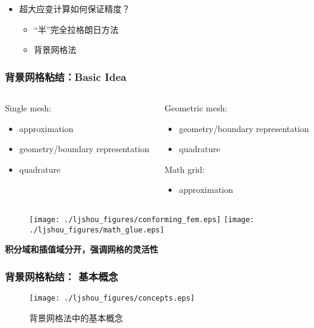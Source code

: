 \documentclass[mathserif]{beamer}
\begin{document}
\begin{CJK}{UTF8}{gkai}
\begin{frame}
\begin{itemize}
				\item 超大应变计算如何保证精度？

				\begin{itemize}
					\item “半”完全拉格朗日方法
					\item 背景网格法
				\end{itemize}
						
			\end{itemize}

		\end{frame}	
		
	\begin{frame}
		\frametitle{背景网格粘结：Basic Idea}
		\begin{columns}
			\begin{column}[pos]{0.5\textwidth}
				Single mesh:				
				\begin{itemize}
					\item approximation
					\item geometry/boundary representation
					\item quadrature
				\end{itemize}
			\end{column}
			\begin{column}[pos]{0.6\textwidth}
				Geometric mesh: 
				\begin{itemize}
					\item geometry/boundary representation
					\item quadrature
				\end{itemize}
				Math grid:
				\begin{itemize}
					\item approximation			
				\end{itemize}
			\end{column}
		\end{columns}
				\begin{figure}
					\centering
					\texttt{[image: ./ljshou\_figures/conforming\_fem.eps]}
					\texttt{[image: ./ljshou\_figures/math\_glue.eps]}
			\end{figure}
			
			\begin{block}{}
				\color{red}\bf 积分域和插值域分开，强调网格的灵活性
			\end{block}
	\end{frame}
		
		\begin{frame}
			\frametitle{背景网格粘结： 基本概念}
				\begin{figure}
					\centering
					\texttt{[image: ./ljshou\_figures/concepts.eps]}
					\caption{背景网格法中的基本概念}
			\end{figure}
		\end{frame}
		

\end{CJK}
\end{document}

